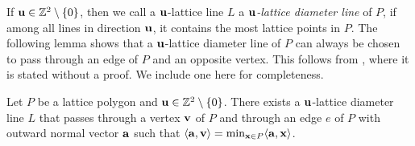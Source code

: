 If $\mathbf{u} \in \mathbb{Z}^2 \setminus \{0\}$, then we call a $\mathbf{u}$-lattice line $L$ a \emph{$\mathbf{u}$-lattice diameter line} of $P$, if among all lines in direction $\mathbf{u}$, it contains the most lattice points in $P$. The following lemma shows that a $\mathbf{u}$-lattice diameter line of $P$ can always be chosen to pass through an edge of $P$ and an opposite vertex. This follows from \cite[Lemma~1]{Barany_Furedi}, where it is stated without a proof. We include one here for completeness.

\begin{lemma}\cite[Lemma 1]{Barany_Furedi}\label{lemma:vertex_edge_pair}
Let $P$ be a lattice polygon and $\mathbf{u} \in \mathbb{Z}^2 \setminus \{0\}$. There exists a $\mathbf{u}$-lattice diameter line $L$ that passes through a vertex $\mathbf{v}$ of $P$ and through an edge $e$ of $P$ with outward normal vector $\mathbf{a}$ such that $\langle \mathbf{a}, \mathbf{v} \rangle = \min_{\mathbf{x} \in P} \langle \mathbf{a},\mathbf{x} \rangle$.
\end{lemma}


